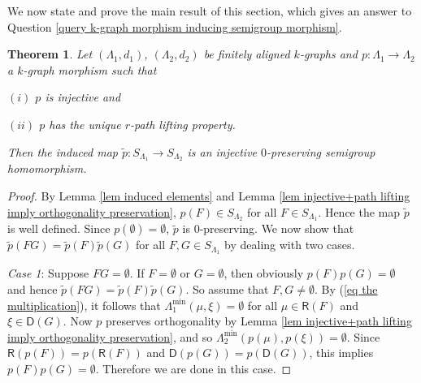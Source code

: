 \documentclass[a4paper,reqno,11pt]{amsart}
\numberwithin{equation}{section}
\newtheorem{thm}{Theorem}[section]
\theoremstyle{definition}
\theoremstyle{remark}
\begin{document}
We now state and prove the main result of this section, which gives an answer to Question \ref{query k-graph morphism inducing semigroup morphism}.
\begin{thm}\label{th answer to the query}
Let $(\Lambda_1,d_1)$, $(\Lambda_2,d_2)$ be finitely aligned $k$-graphs and $p:\Lambda_1\longrightarrow \Lambda_2$ a $k$-graph morphism such that 

$(i)$ $p$ is injective and 

$(ii)$ $p$ has the unique $r$-path lifting property.

Then the induced map $\tilde{p}:S_{\Lambda_1}\longrightarrow S_{\Lambda_2}$ is an injective $0$-preserving semigroup homomorphism.
\end{thm}
\begin{proof}
By Lemma \ref{lem induced elements} and Lemma \ref{lem injective+path lifting imply orthogonality preservation}, $p(F)\in S_{\Lambda_2}$ for all $F\in S_{\Lambda_1}$. Hence the map $\tilde{p}$ is well defined. Since $p(\emptyset)=\emptyset$, $\tilde{p}$ is $0$-preserving. We now show that $\tilde{p}(FG)=\tilde{p}(F)\tilde{p}(G)$ for all $F,G\in S_{\Lambda_1}$ by dealing with two cases.

\emph{Case 1}: Suppose $FG=\emptyset$. If $F=\emptyset$ or $G=\emptyset$, then obviously $p(F)p(G)=\emptyset$ and hence $\tilde{p}(FG)=\tilde{p}(F)\tilde{p}(G)$. So assume that $F,G\neq \emptyset$. By (\ref{eq the multiplication}), it follows that $\Lambda_1^{\min}(\mu,\xi)=\emptyset$ for all $\mu\in \mathsf{R}(F)$ and $\xi\in \mathsf{D}(G)$. Now $p$ preserves orthogonality by Lemma \ref{lem injective+path lifting imply orthogonality preservation}, and so $\Lambda_2^{\min}(p(\mu),p(\xi))=\emptyset$. Since $\mathsf{R}(p(F))=p(\mathsf{R}(F))$ and $\mathsf{D}(p(G))=p(\mathsf{D}(G))$, this implies $p(F)p(G)=\emptyset$. Therefore we are done in this case.


\end{proof}
\end{document}
